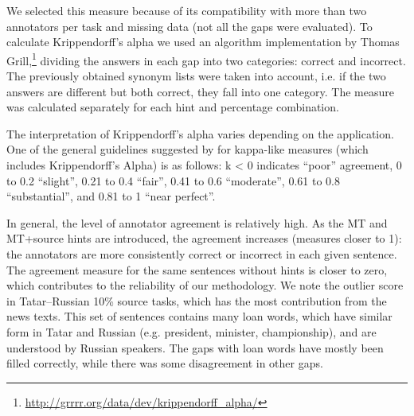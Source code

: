 \documentclass[11pt]{article}
\newcommand{\comment}[1]{}
\begin{document}
We selected this measure because of its compatibility with more than two annotators per task and missing data (not all the gaps were evaluated). To calculate Krippendorff's alpha we used an algorithm implementation by Thomas Grill,\footnote{\url{http://grrrr.org/data/dev/krippendorff_alpha/}} dividing the answers in each gap into two categories: correct and incorrect. The previously obtained synonym lists were taken into account, i.e. if the two answers are different but both correct, they fall into one category. The measure was calculated separately for each hint and percentage combination.

The interpretation of Krippendorff's alpha varies depending on the application. One of the general guidelines suggested by \citet{landis77} for kappa-like measures (which includes Krippendorff's Alpha) is as follows: k < 0 indicates ``poor'' agreement, 0 to 0.2 ``slight'', 0.21 to 0.4 ``fair'', 0.41 to 0.6 ``moderate'', 0.61 to 0.8 ``substantial'', and 0.81 to 1 ``near perfect''.

In general, the level of annotator agreement is relatively high. As the MT and MT+source hints are introduced, the agreement increases (measures closer to 1): the annotators are more consistently correct or incorrect in each given sentence. The agreement measure for the same sentences without hints is closer to zero, which contributes to the reliability of our methodology. We note the outlier score in Tatar--Russian 10\% source tasks, which has the most contribution from the news texts. \comment{EA: this Alpha is from a table we do not report here, I added a couple of words to clarify}This set of sentences contains many loan words, which have similar form in Tatar and Russian (e.g. president, minister, championship), and are understood by Russian speakers. The gaps with loan words have mostly been filled correctly, while there was some disagreement in other gaps.

\end{document}
